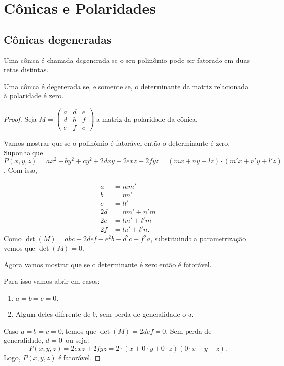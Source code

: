 \chapter{Cônicas e Polaridades}
\section{Cônicas degeneradas}
\begin{defn}
Uma cônica é chamada degenerada se o seu polinômio pode ser fatorado em duas retas distintas.
\end{defn}

\begin{thm}
Uma cônica é degenerada se, e somente se, o determinante da matriz relacionada à polaridade é zero.
\end{thm}
\begin{proof}
Seja $M = \begin{pmatrix} a& d& e \\ d& b& f \\ e& f& c\end{pmatrix}$ a matriz da polaridade da cônica.

Vamos mostrar que se o polinômio é fatorável então o determinante é zero.
Suponha que $P(x,y,z) = ax^2+by^2+cy^2+2dxy+2exz+2fyz = (mx+ny+lz)\cdot(m'x+n'y+l'z)$. Com isso,

\begin{align*}
    a &= mm' \\
    b &= nn' \\
    c &= ll'\\
    2d &= nm'+n'm\\
    2e &= lm'+l'm\\
    2f &=ln'+l'n.
\end{align*}
Como $\det(M) = abc + 2def -e^2b-d^2c-f^2a$, substituindo a parametrização vemos que $\det(M) = 0$.

Agora vamos mostrar que se o determinante é zero então é fatorável.

Para isso vamos abrir em casos:
\begin{enumerate}
    \item $a=b=c=0$.
    \item Algum deles diferente de 0, sem perda de generalidade o $a$.
\end{enumerate}

Caso $a=b=c=0$, temos que $\det(M) = 2def = 0$. Sem perda de generalidade, $d=0$, ou seja:
\[ P(x,y,z) = 2exz+2fyz = 2\cdot(x+0\cdot y + 0 \cdot z)(0\cdot x + y + z).\]
Logo, $P(x,y,z)$ é fatorável.


\end{proof}
